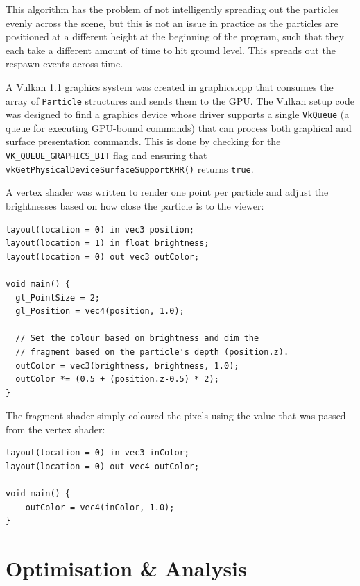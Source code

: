 \documentclass[11pt, a4paper, twocolumn]{article}
\begin{document}
This algorithm has the problem of not intelligently spreading out the particles evenly across the scene, but this is not an issue in practice as the particles are positioned at a different height at the beginning of the program, such that they each take a different amount of time to hit ground level. This spreads out the respawn events across time.

A Vulkan 1.1 graphics system was created in graphics.cpp that consumes the array of \verb|Particle| structures and sends them to the GPU. The Vulkan setup code was designed to find a graphics device whose driver supports a single \verb|VkQueue| (a queue for executing GPU-bound commands) that can process both graphical and surface presentation commands. This is done by checking for the \verb|VK_QUEUE_GRAPHICS_BIT| flag and ensuring that \verb|vkGetPhysicalDeviceSurfaceSupportKHR()| returns \verb|true|.

A vertex shader was written to render one point per particle and adjust the brightnesses based on how close the particle is to the viewer:

\begin{verbatim}
layout(location = 0) in vec3 position;
layout(location = 1) in float brightness;
layout(location = 0) out vec3 outColor;

void main() {
  gl_PointSize = 2;
  gl_Position = vec4(position, 1.0);

  // Set the colour based on brightness and dim the
  // fragment based on the particle's depth (position.z).
  outColor = vec3(brightness, brightness, 1.0);
  outColor *= (0.5 + (position.z-0.5) * 2);
}
\end{verbatim}

The fragment shader simply coloured the pixels using the value that was passed from the vertex shader:

\begin{verbatim}
layout(location = 0) in vec3 inColor;
layout(location = 0) out vec4 outColor;

void main() {
    outColor = vec4(inColor, 1.0);
}
\end{verbatim}

\section{Optimisation \& Analysis}
\end{document}
